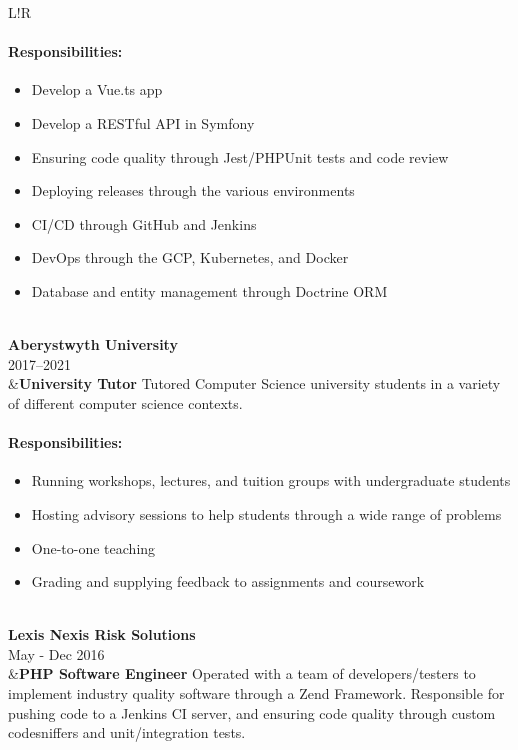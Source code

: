 \documentclass[10pt]{article}
\newcommand\VRule{\color{lightgray}\vrule width 0.5pt}
\begin{document}
\begin{longtable}{L!{\VRule}R}
\vspace{-3mm}
\paragraph{Responsibilities:}
\begin{itemize}[noitemsep,topsep=0pt]
	\item Develop a Vue.ts app
	\item Develop a RESTful API in Symfony
	\item Ensuring code quality through Jest/PHPUnit tests and code review
	\item Deploying releases through the various environments
	\item CI/CD through GitHub and Jenkins
	\item DevOps through the GCP, Kubernetes, and Docker
	\item Database and entity management through Doctrine ORM
\end{itemize}
\\

{\bf Aberystwyth University}\\
2017--2021\\
&{\bf University Tutor}\newline
Tutored Computer Science university students in a variety of different computer science contexts.

\vspace{-3mm}
\paragraph{Responsibilities:}
\begin{itemize}[noitemsep,topsep=0pt]
	\item Running workshops, lectures, and tuition groups with undergraduate students
	\item Hosting advisory sessions to help students through a wide range of problems
	\item One-to-one teaching
	\item Grading and supplying feedback to assignments and coursework
\end{itemize}
\\

{\bf Lexis Nexis Risk Solutions}\\
May - Dec 2016\\
&{\bf PHP Software Engineer}\newline
Operated with a team of developers/testers to implement industry quality software through a Zend Framework. Responsible for pushing code to a Jenkins CI server, and ensuring code quality through custom codesniffers and unit/integration tests.


\end{longtable}
\end{document}
